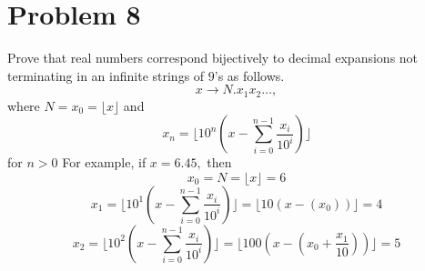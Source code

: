 \documentclass[11pt]{article}
\begin{document}
\section*{Problem 8}
\begin{problem}
    Prove that real numbers correspond bijectively to decimal expansions not terminating in an infinite strings of $9$'s as follows. 
    \[x \to N.x_1x_2\dots,\] where $N = x_0 = \lfloor x\rfloor$ and \[x_n = \lfloor 10^{n}\left(x - \sum_{i=0}^{n-1}\frac{x_i}{10^i}\right)\rfloor\] for $n>0$ For example, if $x = 6.45,$ then 
    \[x_0 = N = \lfloor x \rfloor = 6\]
    \[x_1 = \lfloor 10^1\left(x - \sum_{i=0}^{n-1}\frac{x_i}{10^i}\right)\rfloor = \lfloor10(x - (x_0))\rfloor = 4\]
    \[x_2 = \lfloor 10^2\left(x - \sum_{i=0}^{n-1}\frac{x_i}{10^i}\right)\rfloor = \lfloor100(x - (x_0 + \frac{x_1}{10}))\rfloor = 5\]
\end{problem}
\end{document}
